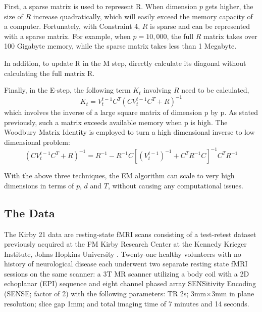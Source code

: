 \documentclass[fleqn]{article}
\newcommand{\T}{T}
\begin{document}
First, a sparse matrix is used to represent R. When dimension $p$ gets higher, the size of $R$ increase quadratically, which will easily exceed the memory capacity of a computer.  Fortunately, with Constraint 4, $R$ is sparse and can be represented with a sparse matrix. For example, when $p=10,000$, the full $R$ matrix takes over 100 Gigabyte memory, while the sparse matrix takes less than 1 Megabyte.

In addition, to update R in the M step, directly calculate its diagonal without calculating the full matrix R.

Finally, in the E-step, the following term $K_t$ involving $R$ need to be calculated,
\[
K_t=V_t^{t-1}C^{\T}(CV_t^{t-1}C^{\T}+R)^{-1}
\]
which involves the inverse of a large square matrix of dimension p by p. As stated previously, such a matrix exceeds available memory when p is high. The Woodbury Matrix Identity is employed to turn a high dimensional inverse to low dimensional problem:
\[
(CV_t^{t-1}C^{\T}+R)^{-1} = R^{-1} - R^{-1}C[(V_t^{t-1})^{-1} + C^{\T}R^{-1}C]^{-1}C^{\T}R^{-1}
\]

With the above three techniques, the EM algorithm can scale to very high dimensions in terms of $p$, $d$ and $T$, without causing any computational issues.

\subsection{The Data}

The Kirby 21 data are resting-state fMRI scans consisting of a test-retest dataset previously acquired at the FM Kirby Research Center at the Kennedy Krieger Institute, Johns Hopkins University \cite{landman2011multi}. Twenty-one healthy volunteers with no history of neurological disease each underwent two separate resting state fMRI sessions on the same scanner: a 3T MR scanner utilizing a body coil with a 2D echoplanar (EPI) sequence and eight channel phased array SENSitivity Encoding (SENSE; factor of 2) with the following parameters: TR 2s; 3mm$\times$3mm in plane resolution; slice gap 1mm; and total imaging time of 7 minutes and 14 seconds.
\end{document}
